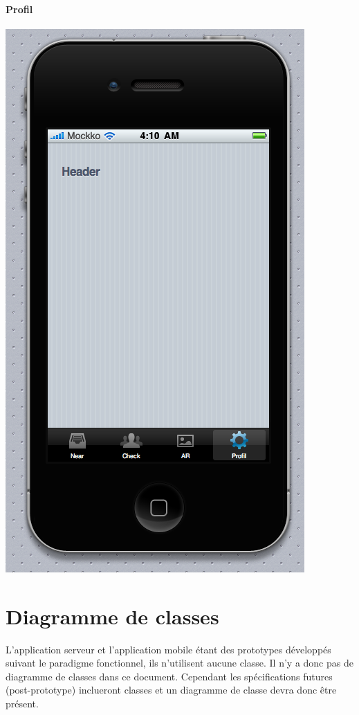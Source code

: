 \documentclass[a4paper,12pt]{report}
\begin{document}
\begin{onehalfspace}
\subsubsection{Profil}
\begin{center}
\includegraphics[height=\thehauteurscreen cm]{img/5_profil.png}
\end{center}

\chapter{Diagramme de classes} %
\label{cha:diagramme_de_classes}

L'application serveur et l'application mobile étant des prototypes développés suivant le paradigme fonctionnel, ils n'utilisent aucune classe. Il n'y a donc pas de diagramme de classes dans ce document. Cependant les spécifications futures (post-prototype) inclueront classes et un diagramme de classe devra donc être présent.


\end{onehalfspace}
\end{document}
